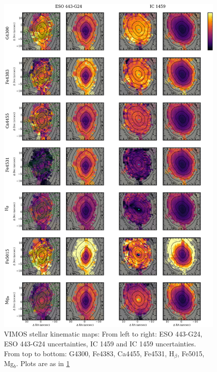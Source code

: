 {{		\begin{figure}
			\centering
			\includegraphics[height=0.94\textheight]{chapter4/vimos/abs1.png}
			\caption[VIMOS absorption line strength maps]{VIMOS stellar kinematic maps: From left to right: ESO 443-G24, ESO 443-G24 uncertainties, IC 1459 and IC 1459 uncertainties. From top to bottom: G4300, Fe4383, Ca4455, Fe4531, H$_\beta$, Fe5015, Mg$_b$. Plots are as in \ref{fig:VIMOS_absorption}}
			\label{fig:VIMOS_absorption}
		\end{figure}
		\begin{figure}
			\centering

\end{figure}}}
